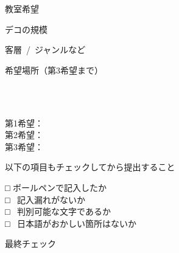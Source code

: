 \documentclass[paper=b4j, landscape, fleqn, jafontsize=9pt, jafontscale=1, head_space=25.5mm, foot_space=15mm, fore-edge=14.5mm, gutter=14.5mm, hanging_punctuation, baselineskip=7mm]{jlreq}
\begin{document}
\begin{answersheet}
\newcolumn
\begin{question}{教室希望}
    \begin{enumbracketsans}
        \item デコの規模
        \item 客層~/~ジャンルなど
        \item 希望場所（第3希望まで）
    \end{enumbracketsans}
\end{question}
\begin{answer}
    \begin{enumbracketsans}
        \item \kasen{}
        \item \kasen{}\\\noindent\kasen{}\\\noindent\kasen{}
        \item 第1希望：\kasen[width=100mm]{}\\\noindent 第2希望：\kasen[width=100mm]{}\\\noindent 第3希望：\kasen[width=100mm]{}
    \end{enumbracketsans}
\end{answer}
{
\vspace{8mm}
\selectsize{9pt}{12pt}
以下の項目もチェックしてから提出すること\\
\vspace{-7.5mm}
\begin{multicols}{2}
□ ボールペンで記入したか\\
\indent □ ~記入漏れがないか\\
\indent □ ~判別可能な文字であるか\\
\indent □ ~日本語がおかしい箇所はないか
\end{multicols}
}

\vspace{8mm}
\begin{flushright}
    \vskip0.2mm
    最終チェック~\scoringbox{}
\end{flushright}
\vfill

\end{answersheet}
\end{document}
